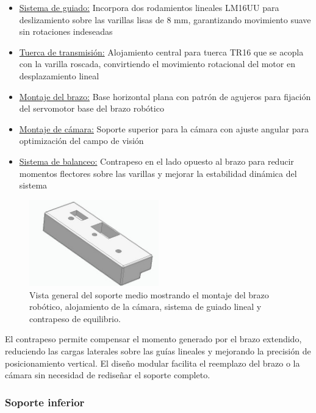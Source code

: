 \begin{itemize}[label=$\bullet$]
    \item \underline{Sistema de guiado:} Incorpora dos rodamientos lineales LM16UU para deslizamiento sobre las varillas lisas de 8 mm, garantizando movimiento suave sin rotaciones indeseadas
    \item \underline{Tuerca de transmisión:} Alojamiento central para tuerca TR16 que se acopla con la varilla roscada, convirtiendo el movimiento rotacional del motor en desplazamiento lineal
    \item \underline{Montaje del brazo:} Base horizontal plana con patrón de agujeros para fijación del servomotor base del brazo robótico
    \item \underline{Montaje de cámara:} Soporte superior para la cámara con ajuste angular para optimización del campo de visión
    \item \underline{Sistema de balanceo:} Contrapeso en el lado opuesto al brazo para reducir momentos flectores sobre las varillas y mejorar la estabilidad dinámica del sistema
\end{itemize}

\begin{figure}[H]
    \centering
    \includegraphics[width=0.5\textwidth]{img/MedioReal_simplificado_vista.jpg}
    \caption{Vista general del soporte medio mostrando el montaje del brazo robótico, alojamiento de la cámara, sistema de guiado lineal y contrapeso de equilibrio.}
    \label{fig:soporte_medio_Real}
\end{figure}

El contrapeso permite compensar el momento generado por el brazo extendido, reduciendo las cargas laterales sobre las guías lineales y mejorando la precisión de posicionamiento vertical. El diseño modular facilita el reemplazo del brazo o la cámara sin necesidad de rediseñar el soporte completo.

\subsubsection{Soporte inferior}

